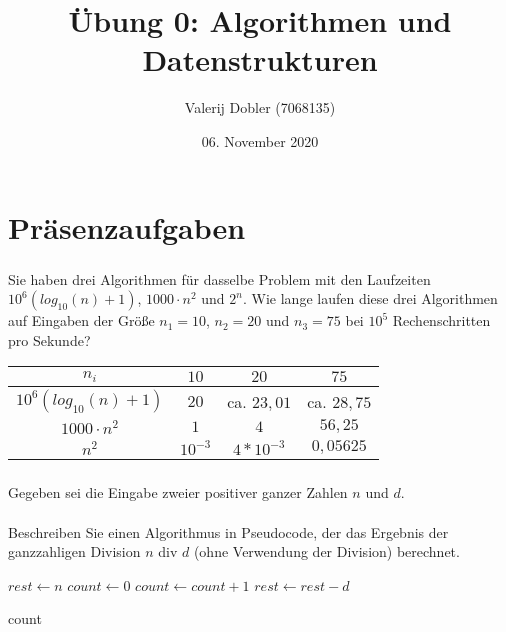 \documentclass[12pt]{article}
\title{Übung 0: Algorithmen und Datenstrukturen}
\author{Valerij Dobler (7068135)}
\date{06. November 2020}
\theoremstyle{remark}
\begin{document}
\maketitle
\part{Präsenzaufgaben}

\section{}

Sie haben drei Algorithmen für dasselbe Problem mit den Laufzeiten $10^6(log_{10}(n) + 1)$, $1000·n^2$ und $2^n$. Wie lange laufen diese drei Algorithmen auf Eingaben der Größe $n_1 = 10$,
$n_2 = 20$ und $n_3 = 75$ bei $10^5$ Rechenschritten pro Sekunde?

\begin{center}
    \begin{tabular}{c|c|c|c}
        $n_i$ & $10$ & $20$ & $75$ \\ \hline
        $10^6(log_{10}(n) + 1)$ & $20$ & ca. $23,01$ & ca. $28,75$ \\ \hline
        $1000·n^2$ & $1$ & $4$ & $56,25$ \\ \hline
        $n^2$ & $10^{-3}$ & $4*10^{-3}$ & $ 0,05625$ \\
    \end{tabular}
\end{center}

\section{}

Gegeben sei die Eingabe zweier positiver ganzer Zahlen $n$ und $d$.

\subsection{} Beschreiben Sie einen Algorithmus in Pseudocode, der das Ergebnis der ganzzahligen
Division $n$ div $d$ (ohne Verwendung der Division) berechnet.

\newpage

\begin{center}
\begin{algorithmic}
    \EndIf
    \State $rest \gets n$
    \State $count \gets 0$
        \State $count \gets count + 1$
        \State $rest \gets rest - d$
    \EndWhile
    
    
    \Return count
\EndFunction
\end{algorithmic}
\end{center}
\end{document}
